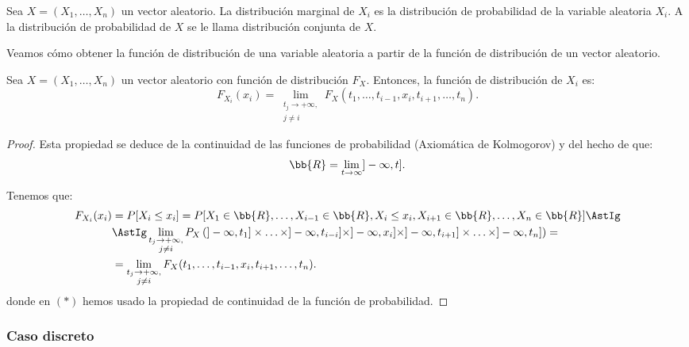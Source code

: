 \begin{definicion}
    Sea $X=(X_1, \ldots, X_n)$ un vector aleatorio. La distribución marginal de $X_i$ es la distribución de probabilidad de la variable aleatoria $X_i$. A la distribución de probabilidad de $X$ se le llama distribución conjunta de $X$.
\end{definicion}

Veamos cómo obtener la función de distribución de una variable aleatoria a partir de la función de distribución de un vector aleatorio.
\begin{prop}
    Sea $X=(X_1, \ldots, X_n)$ un vector aleatorio con función de distribución $F_X$. Entonces, la función de distribución de $X_i$ es:
    \begin{equation*}
        F_{X_i}(x_i) = \lim_{\substack{t_j\to +\infty,\\j\neq i}} F_X(t_1, \ldots, t_{i-1}, x_i, t_{i+1}, \ldots, t_n).
    \end{equation*}
\end{prop}
\begin{proof}
    Esta propiedad se deduce de la continuidad de las funciones de probabilidad (Axiomática de Kolmogorov) y del hecho de que:
    \begin{equation*}
        \bb{R} = \lim_{t\to \infty} ]-\infty, t].
    \end{equation*}

    Tenemos que:
    \begin{align*}
        F_{X_i}(x_i) &= P[X_i\leq x_i] = P[X_1\in \bb{R}, \ldots, X_{i-1}\in \bb{R}, X_i\leq x_i, X_{i+1}\in \bb{R}, \ldots, X_n\in \bb{R}] \AstIg\\
        &\AstIg
        \lim_{\substack{t_j\to +\infty,\\j\neq i}}
        P_X\left(]-\infty, t_1]\times \ldots \times  ]-\infty, t_{i-i}]\times ]-\infty, x_i] \times ]-\infty, t_{i+1}] \times \ldots \times ]-\infty, t_n]\right) =\\
        &= \lim_{\substack{t_j\to +\infty,\\j\neq i}} F_X(t_1, \ldots, t_{i-1}, x_i, t_{i+1}, \ldots, t_n).
    \end{align*}
    donde en $(\ast)$ hemos usado la propiedad de continuidad de la función de probabilidad.
\end{proof}

\subsubsection{Caso discreto}

